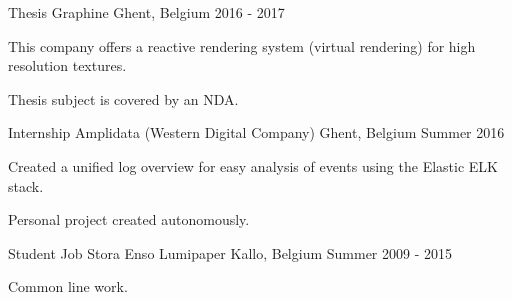 


\begin{cventries}


\cventry
{Thesis} %
{Graphine} %
{Ghent, Belgium} %
{2016 - 2017} %
{ %
\begin{cvitems}
\item {This company offers a reactive rendering system (virtual rendering) for high resolution textures.}
\item {Thesis subject is covered by an NDA.}
\end{cvitems}
}


\cventry
{Internship} %
{Amplidata (Western Digital Company)} %
{Ghent, Belgium} %
{Summer 2016} %
{ %
\begin{cvitems}
\item {Created a unified log overview for easy analysis of events using the Elastic ELK stack.}
\item {Personal project created autonomously.}
\end{cvitems}
}


\cventry
{Student Job} %
{Stora Enso Lumipaper} %
{Kallo, Belgium} %
{Summer 2009 - 2015} %
{ %
\begin{cvitems}
\item {Common line work.}
\end{cvitems}
}


\end{cventries}